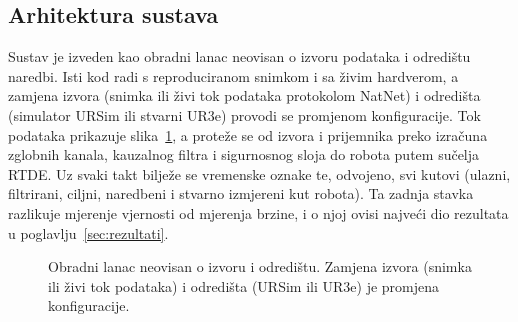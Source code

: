 \subsection{Arhitektura sustava}

Sustav je izveden kao obradni lanac neovisan o izvoru podataka i odredištu
naredbi. Isti kod radi s reproduciranom snimkom i sa živim hardverom, a zamjena
izvora (snimka ili živi tok podataka protokolom NatNet) i odredišta
(simulator URSim ili stvarni UR3e) provodi se promjenom konfiguracije. Tok podataka
prikazuje slika~\ref{fig:arhitektura}, a proteže se od izvora i prijemnika preko
izračuna zglobnih kanala, kauzalnog filtra i sigurnosnog sloja do robota
putem sučelja RTDE. Uz svaki takt bilježe se vremenske oznake te, odvojeno,
svi kutovi (ulazni, filtrirani, ciljni, naredbeni i stvarno izmjereni kut robota).
Ta zadnja stavka razlikuje mjerenje vjernosti od mjerenja brzine, i o njoj ovisi
najveći dio rezultata u poglavlju~\ref{sec:rezultati}.

\begin{figure}[t]
  \centering
  \caption{Obradni lanac neovisan o izvoru i odredištu. Zamjena izvora (snimka
  ili živi tok podataka) i odredišta (URSim ili UR3e) je promjena
  konfiguracije.}
  \label{fig:arhitektura}
\end{figure}

